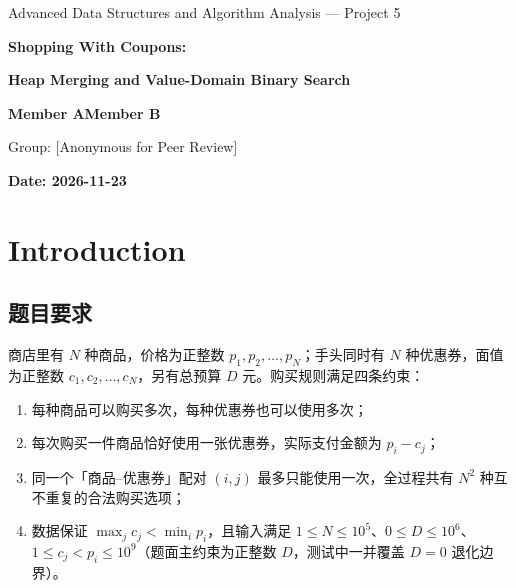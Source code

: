 \documentclass[12pt,a4paper,fontset=windows]{ctexart}
\theoremstyle{plain}
\begin{document}
\begin{titlepage}
\centering
\vspace*{1.6cm}
{\fontsize{13}{16}\selectfont Advanced Data Structures and Algorithm Analysis --- Project 5\par}

\vspace{1.2cm}
{\bfseries\fontsize{24}{31}\selectfont Shopping With Coupons:\par}
\vspace{0.45em}
{\bfseries\fontsize{20}{27}\selectfont Heap Merging and Value-Domain Binary Search\par}

\vspace{1.8cm}
{\bfseries\fontsize{16}{20}\selectfont Member A\hspace{2.2em}Member B}

\vspace{0.8cm}
{\fontsize{12}{15}\selectfont Group: [Anonymous for Peer Review]}

\vspace{1.0cm}
{\bfseries\fontsize{13}{16}\selectfont Date: 2026-11-23}
\end{titlepage}

\section{Introduction}

\subsection{题目要求}

商店里有 $N$ 种商品，价格为正整数 $p_1, p_2, \dots, p_N$；手头同时有 $N$ 种优惠券，面值为正整数 $c_1, c_2, \dots, c_N$，另有总预算 $D$ 元。购买规则满足四条约束：

\begin{enumerate}[leftmargin=1.8em,itemsep=0.12em,topsep=0.18em]
  \item 每种商品可以购买多次，每种优惠券也可以使用多次；
  \item 每次购买一件商品恰好使用一张优惠券，实际支付金额为 $p_i - c_j$；
  \item 同一个「商品--优惠券」配对 $(i, j)$ 最多只能使用一次，全过程共有 $N^2$ 种互不重复的合法购买选项；
  \item 数据保证 $\max_j c_j < \min_i p_i$，且输入满足 $1 \le N \le 10^5$、$0 \le D \le 10^6$、$1 \le c_j < p_i \le 10^9$（题面主约束为正整数 $D$，测试中一并覆盖 $D=0$ 退化边界）。
\end{enumerate}
\end{document}
